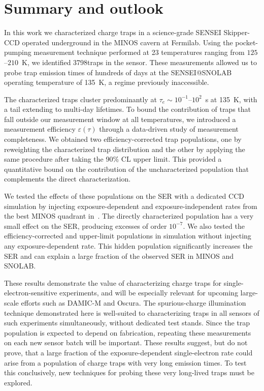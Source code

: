 \documentclass[aps, prapplied,twocolumn,showpacs,superscriptaddress,preprintnumbers, longbibliography,nofootinbib,floatfix]{revtex4-2}
\newcommand{\ntraps}{3798}
\begin{document}
\section{Summary and outlook}\label{sec:discussion}

In this work we characterized charge traps in a science-grade SENSEI Skipper-CCD operated underground in the MINOS cavern at Fermilab. 
Using the pocket-pumping measurement technique performed at 23 temperatures ranging from $125$--$210$~K, we identified \ntraps\;traps in the sensor. 
These measurements allowed us to probe trap emission times of hundreds of days at the SENSEI@SNOLAB operating temperature of 135~K, a regime previously inaccessible.

The characterized traps cluster predominantly at $\tau_e \sim 10^{-1}$--$10^{2}$~s at 135~K, with a tail extending to multi-day lifetimes. 
To bound the contribution of traps that fall outside our measurement window at all temperatures, we introduced a measurement efficiency $\varepsilon(\tau)$ through a data-driven study of measurement completeness. 
We obtained two efficiency-corrected trap populations, one by reweighting the characterized trap distribution and the other by applying the same procedure after taking the 90\% CL upper limit. 
This provided a quantitative bound on the contribution of the uncharacterized population that complements the direct characterization.

We tested the effects of these populations on the SER with a dedicated CCD simulation by injecting exposure-dependent and exposure-independent rates from the best MINOS quadrant in~\cite{SENSEI:2024yyt}. 
The directly characterized population has a very small effect on the SER, producing excesses of order $10^{-7}$. 
We also tested the efficiency-corrected and upper-limit populations in simulation without injecting any exposure-dependent rate. 
This hidden population significantly increases the SER and can explain a large fraction of the observed SER in MINOS and SNOLAB.

These results demonstrate the value of characterizing charge traps for single-electron-sensitive experiments, and will be especially relevant for upcoming large-scale efforts such as DAMIC-M and Oscura. 
The spurious-charge illumination technique demonstrated here is well-suited to characterizing traps in all sensors of such experiments simultaneously, without dedicated test stands. 
Since the trap population is expected to depend on fabrication, repeating these measurements on each new sensor batch will be important. 
These results suggest, but do not prove, that a large fraction of the exposure-dependent single-electron rate could arise from a population of charge traps with very long emission times. 
To test this conclusively, new techniques for probing these very long-lived traps must be explored.
\end{document}
